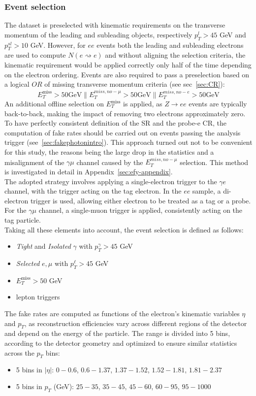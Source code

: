 \subsubsection{Event selection}
The dataset is preselected with kinematic requirements on the transverse momentum of the leading and subleading objects, respectively $p_T^{l} > 45 $ GeV and $p_T^{sl} > 10 $ GeV.
However, for $ee$ events both the leading and subleading electrons are used to compute $N(e\rightsquigarrow e)$ and without aligning the selection criteria, the kinematic requirement would be applied correctly only half of the time depending on the electron ordering.
Events are also required to pass a preselection based on a logical $OR$ of missing transverse momentum criteria (see sec~\ref{sec:CR}):
$$E_T^{\text{miss}}> 50 \text{GeV} \parallel E_T^{miss, no-\mu}> 50 \text{GeV}  \parallel  E_T^{miss, no-e}> 50 \text{GeV} $$
An additional offline selection on $E_T^{\text{miss}}$ is applied, as $Z \rightarrow ee$ events are typically back-to-back, making the impact of removing two electrons approximately zero. \\
To have perfectly consistent definition of the SR and the probe-e CR, the computation of fake rates should be carried out on events passing the analysis trigger (see~\ref{sec:fakephotonintro}). 
This approach turned out not to be convenient for this study, the reasons being the large drop in the statistics and a misalignment of the $\gamma \mu$ channel caused by the $E_T^{miss, no-\mu}$ selection. This method is investigated in detail in Appendix~\ref{sec:efy-appendix}. \\
The adopted strategy involves applying a single-electron trigger to the $\gamma e$ channel, with the trigger acting on the tag electron. 
In the $ee$ sample, a di-electron trigger is used, allowing either electron to be treated as a tag or a probe. 
For the $\gamma\mu$ channel, a single-muon trigger is applied, consistently acting on the tag particle. \\
Taking all these elements into account, the event selection is defined as follows:
\begin{itemize}
\item \textit{Tight} and \textit{Isolated} $\gamma$ with $p_T^{\gamma} > 45 $ GeV
\item \textit{Selected} $e, \mu$ with $p_T^{\ell} > 45 $ GeV
\item $E_T^{\text{miss}} > 50$ GeV
\item lepton triggers 
\end{itemize}
The fake rates are computed as functions of the electron’s kinematic variables $\eta$ and $p_T$, as reconstruction efficiencies vary across different regions of the detector and depend on the energy of the particle.
The range is divided into 5 bins, according to the detector geometry and optimized to ensure similar statistics across the $p_T$ bins:
\begin{itemize} 
\item 5 bins in $|\eta|$: $0 - 0.6$, $0.6 - 1.37$, $1.37 - 1.52$, $1.52 - 1.81$, $1.81 - 2.37$ 
\item 5 bins in $p_T$ (GeV): $25 - 35$, $35 - 45$, $45 - 60$, $60 - 95$, $95 - 1000$
\end{itemize}

